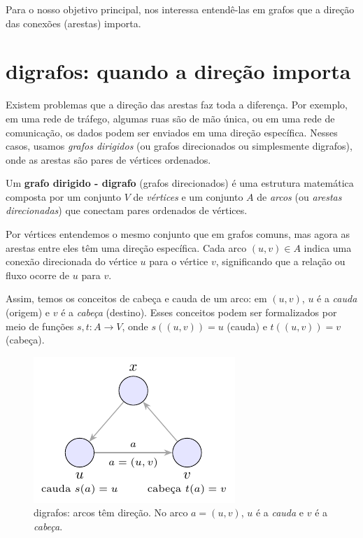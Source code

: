 Para o nosso objetivo principal, nos interessa entendê-las em grafos que a direção das conexões (arestas) importa.

\section{digrafos: quando a direção importa}

Existem problemas que a direção das arestas faz toda a diferença. Por exemplo, em uma rede de tráfego, algumas ruas são de mão única, ou em uma rede de comunicação, os dados podem ser enviados em uma direção específica. Nesses casos, usamos \emph{grafos dirigidos} (ou grafos direcionados ou simplesmente digrafos), onde as arestas são pares de vértices ordenados.


Um \textbf{grafo dirigido - digrafo} (grafos direcionados) é uma estrutura matemática composta por um conjunto \(V\) de \emph{vértices} e um conjunto \(A\) de \emph{arcos} (ou \emph{arestas direcionadas}) que conectam pares ordenados de vértices.


Por vértices entendemos o mesmo conjunto que em grafos comuns, mas agora as arestas entre eles têm uma direção específica. Cada arco \((u, v) \in A\) indica uma conexão direcionada do vértice \(u\) para o vértice \(v\), significando que a relação ou fluxo ocorre de \(u\) para \(v\).


Assim, temos os conceitos de cabeça e cauda de um arco: em \((u, v)\), \(u\) é a \emph{cauda} (origem) e \(v\) é a \emph{cabeça} (destino). Esses conceitos podem ser formalizados por meio de funções \(s, t: A \to V\), onde \(s((u, v)) = u\) (cauda) e \(t((u, v)) = v\) (cabeça).


\begin{figure}[H]
	\centering
	\includegraphics[width=0.9\linewidth]{figures/fig_def_digrafo.pdf}

	\caption{digrafos: arcos têm direção. No arco $a=(u,v)$, $u$ é a \emph{cauda} e $v$ é a \emph{cabeça}.}
	\label{fig:def-digrafo}
\end{figure}



